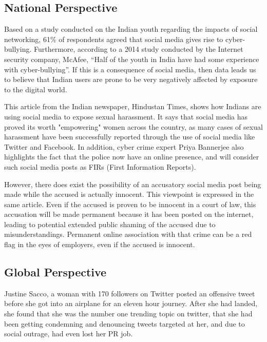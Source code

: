 \documentclass[a4paper, 11pt]{article}
\begin{document}
  \subsection{National Perspective}

    Based on a study conducted on the Indian youth regarding the impacts of social networking, 61\% of respondents agreed that social media gives rise to cyber-bullying.\cite{indian-youth-study} Furthermore, according to a 2014 study conducted by the Internet security company, McAfee, “Half of the youth in India have had some experience with cyber-bullying”.
    If this is a consequence of social media, then data leads us to believe that Indian users are prone to be very negatively affected by exposure to the digital world.

    This article from the Indian newspaper, Hindustan Times, shows how Indians are using social media to expose sexual harassment.\cite{hindustan-times-shaming} It says that social media has proved its worth "empowering" women across the country, as many cases of sexual harassment have been successfully reported through the use of social media like Twitter and Facebook. In addition, cyber crime expert Priya Bannerjee also highlights the fact that the police now have an online presence, and will consider such social media posts as FIRs (First Information Reports).

    However, there does exist the possibility of an accusatory social media post being made while the accused is actually innocent. This viewpoint is expressed in the same article. \cite{hindustan-times-shaming} Even if the accused is proven to be innocent in a court of law, this accusation will be made permanent because it has been posted on the internet, leading to potential extended public shaming of the accused due to misunderstandings. Permanent online association with that crime can be a red flag in the eyes of employers, even if the accused is innocent.

  \subsection{Global Perspective}
    Justine Sacco, a woman with 170 followers on Twitter posted an offensive tweet before she got into an airplane for an eleven hour journey. After she had landed, she found that she was the number one trending topic on twitter, that she had been getting condemning and denouncing tweets targeted at her, and due to social outrage, had even lost her PR job.
\end{document}
